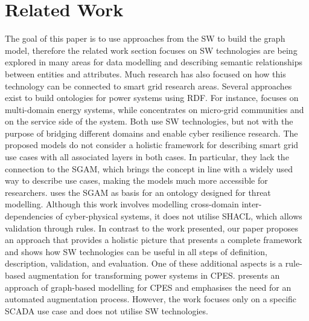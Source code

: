 \section{Related Work}
\label{subsec:furtherwork}
The goal of this paper is to use approaches from the \ac{SW} to build the graph model, therefore the related work section focuses on  
\ac{SW} technologies are being explored in many areas for data modelling and describing semantic relationships between entities and attributes. Much research has also focused on how this technology can be connected to smart grid research areas.
Several approaches exist to build ontologies for power systems using \ac{RDF}.
For instance, \cite{devanand_ontopowsys_2020} focuses on multi-domain energy systems, while \cite{chun_knowledge_2018} concentrates on micro-grid communities and on the service side of the system.
Both use \ac{SW} technologies, but not with the purpose of bridging different domains and enable cyber resilience research.
The proposed models do not consider a holistic framework for describing smart grid use cases with all associated layers in both cases. In particular, they lack the connection to the \ac{SGAM}, which brings the concept in line with a widely used way to describe use cases, making the models much more accessible for researchers.
\cite{sandbergdeliverable} uses the \ac{SGAM} as basis for an ontology designed for threat modelling.
Although this work involves modelling cross-domain inter-dependencies of cyber-physical systems, it does not utilise SHACL, which allows validation through rules.
In contrast to the work presented, our paper proposes an approach that provides a holistic picture that presents a complete framework and shows how \ac{SW} technologies can be useful in all steps of definition, description, validation, and evaluation.
One of these additional aspects is a rule-based augmentation for transforming power systems in \ac{CPES}.
\cite{klaer_sg3_2020} presents an approach of graph-based modelling for \ac{CPES} and emphasises the need for an automated augmentation process. However, the work focuses only on a specific \ac{SCADA} use case and does not utilise \ac{SW} technologies. 




